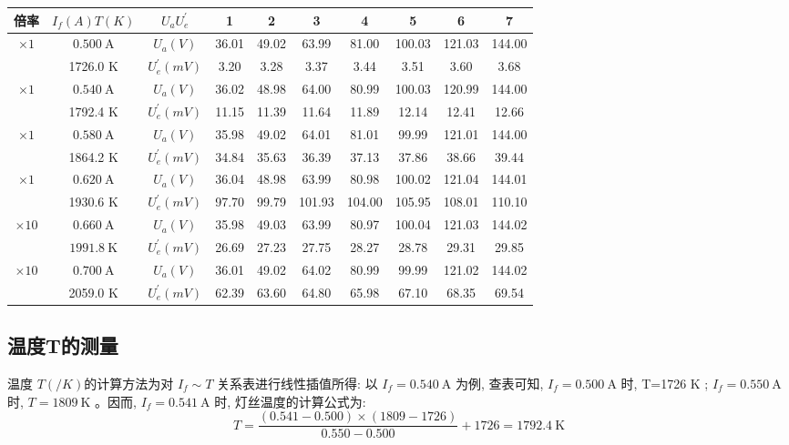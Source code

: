 \documentclass[UTF8]{ctexart}
\begin{document}
\begin{tabular}{c|c|c|c|c|c|c|c|c|c}
  \hline 倍率  & $I_{f}(A) T(K)$ &$ U_{a} U_{e}^{\prime}$ & 1 & 2 & 3 & 4 & 5 & 6 & 7 \\
  \hline \multirow{2}{*}{$\times 1$} & $0.500 \mathrm{~A}$ & $U_{a}(V)$ & 36.01 & 49.02 & 63.99 & 81.00 & 100.03 & 121.03 & 144.00 \\
  \cline { 2 - 10 } & 1726.0 K & $U_{e}^{\prime}(mV) $& 3.20 & 3.28 & 3.37 & 3.44 & 3.51 & 3.60 & 3.68 \\
  \hline \multirow{2}{*}{$\times 1$} & $0.540 \mathrm{~A}$ & $U_{a}(V)$ & 36.02 & 48.98 & 64.00 & 80.99 & 100.03 & 120.99 & 144.00 \\
  \cline { 2 - 10 } & 1792.4 K & $U_{e}^{\prime}(mV)$ & 11.15 & 11.39 & 11.64 & 11.89 & 12.14 & 12.41 & 12.66 \\
  \hline \multirow{2}{*}{$\times 1$} & $0.580 \mathrm{~A}$ & $U_{a}(V)$ & 35.98 & 49.02 & 64.01 & 81.01 & 99.99 & 121.01 & 144.00 \\
  \cline { 2 - 10 } & 1864.2 K & $U_{e}^{\prime}(mV)$ & 34.84 & 35.63 & 36.39 & 37.13 & 37.86 & 38.66 & 39.44 \\
  \hline \multirow{2}{*}{$\times 1$} & $0.620 \mathrm{~A}$ & $U_{a}(V)$ & 36.04 & 48.98 & 63.99 & 80.98 & 100.02 & 121.04 & 144.01 \\
  \cline { 2 - 10 } & 1930.6 K & $U_{e}^{\prime}(mV)$ & 97.70 & 99.79 & 101.93 & 104.00 & 105.95 & 108.01 & 110.10 \\
  \hline \multirow{2}{*}{$\times 10$} & $0.660 \mathrm{~A}$ & $U_{a}(V)$ & 35.98 & 49.03 & 63.99 & 80.97 & 100.04 & 121.03 & 144.02 \\
  \cline { 2 - 10 } & $1991.8 \mathrm{~K}$ & $U_{e}^{\prime}(mV)$ & 26.69 & 27.23 & 27.75 & 28.27 & 28.78 & 29.31 & 29.85 \\
  \hline \multirow{2}{*}{$\times 10$} & $0.700 \mathrm{~A}$ & $U_{a}(V)$ & 36.01 & 49.02 & 64.02 & 80.99 & 99.99 & 121.02 & 144.02 \\
  \cline { 2 - 10 } & 2059.0 K & $U_{e}^{\prime}(mV)$ & 62.39 & 63.60 & 64.80 & 65.98 & 67.10 & 68.35 & 69.54 \\
  \hline
  \end{tabular}

\subsection{温度T的测量}

温度 $ T (/ K)  $的计算方法为对 $ I_{f} \sim T$  关系表进行线性插值所得:
以 $ I_{f}=0.540 \mathrm{~A} $ 为例, 查表可知,  $I_{f}=0.500 \mathrm{~A}$  时,  T=1726 K ; $I_{f}=0.550 \mathrm{~A}$  时,  $T=1809 \mathrm{~K} $ 。因而,  $I_{f}=0.541 \mathrm{~A} $ 时, 灯丝温度的计算公式为:
$$
T=\frac{(0.541-0.500) \times (1809-1726)}{0.550-0.500}+1726=1792.4 \mathrm{~K}
$$
\end{document}
